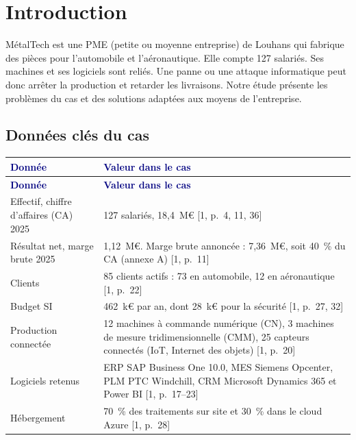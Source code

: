 \documentclass[11pt,a4paper]{article}
\newcommand{\thd}[1]{\textbf{\textcolor{navy}{#1}}}
\newcommand{\figsource}[1]{\par\vspace{-2pt}{\RaggedRight\footnotesize\textcolor{graytext}{#1}\par}}
\begin{document}
\section*{Introduction}
MétalTech est une PME (petite ou moyenne entreprise) de Louhans qui fabrique des pièces pour l'automobile et l'aéronautique. Elle compte 127 salariés. Ses machines et ses logiciels sont reliés. Une panne ou une attaque informatique peut donc arrêter la production et retarder les livraisons. Notre étude présente les problèmes du cas et des solutions adaptées aux moyens de l'entreprise.

\subsection*{Données clés du cas}
\begin{xltabular}{\linewidth}{@{}P{58mm}Y@{}}\toprule
\thd{Donnée} & \thd{Valeur dans le cas}\\\midrule\endfirsthead
\toprule \thd{Donnée} & \thd{Valeur dans le cas}\\\midrule\endhead
\bottomrule\endfoot
Effectif, chiffre d'affaires (CA) 2025 & 127 salariés, 18,4~M€ [1, p.~4, 11, 36]\\
Résultat net, marge brute 2025 & 1,12~M€. Marge brute annoncée : 7,36~M€, soit 40~\% du CA (annexe A) [1, p.~11]\\
Clients & 85 clients actifs : 73 en automobile, 12 en aéronautique [1, p.~22]\\
Budget SI & 462~k€ par an, dont 28~k€ pour la sécurité [1, p.~27, 32]\\
Production connectée & 12 machines à commande numérique (CN), 3 machines de mesure tridimensionnelle (CMM), 25 capteurs connectés (IoT, Internet des objets) [1, p.~20]\\
Logiciels retenus & ERP SAP Business One 10.0, MES Siemens Opcenter, PLM PTC Windchill, CRM Microsoft Dynamics 365 et Power BI [1, p.~17--23]\\
Hébergement & 70~\% des traitements sur site et 30~\% dans le cloud Azure [1, p.~28]\\
\end{xltabular}
\figsource{ERP : logiciel de gestion intégré (commandes, stocks, achats, finance). MES : logiciel qui pilote et suit la production. PLM : logiciel qui gère les plans et les données techniques des produits. CRM : logiciel de gestion de la relation client.}
\end{document}
